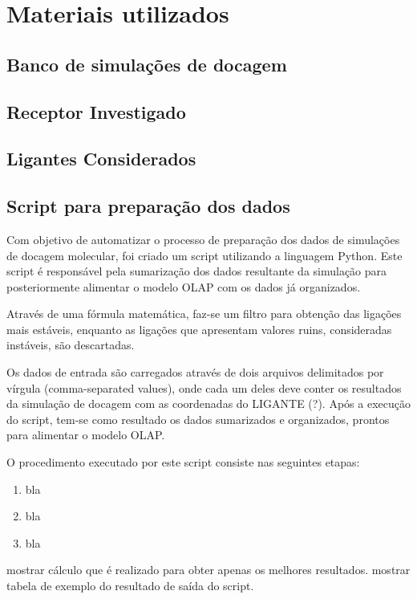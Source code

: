 \chapter{Materiais utilizados}
	
\section{Banco de simulações de docagem}

\section{Receptor Investigado}

\section{Ligantes Considerados}

\section{Script para preparação dos dados}

Com objetivo de automatizar o processo de preparação dos dados de simulações de docagem molecular, foi criado um script utilizando a linguagem Python. Este script é responsável pela sumarização dos dados resultante da simulação para posteriormente alimentar o modelo OLAP com os dados já organizados.

Através de uma fórmula matemática, faz-se um filtro para obtenção das ligações mais estáveis, enquanto as ligações que apresentam valores ruins, consideradas instáveis, são descartadas.

Os dados de entrada são carregados através de dois arquivos delimitados por vírgula (comma-separated values), onde cada um deles deve conter os resultados da simulação de docagem com as coordenadas do LIGANTE (?). Após a execução do script, tem-se como resultado os dados sumarizados e organizados, prontos para alimentar o modelo OLAP.

O procedimento executado por este script consiste nas seguintes etapas:

\begin{enumerate}
    \item bla
    \item bla
    \item bla
\end{enumerate}

mostrar cálculo  que é realizado para obter apenas os melhores resultados.
mostrar tabela de exemplo do resultado de saída do script.